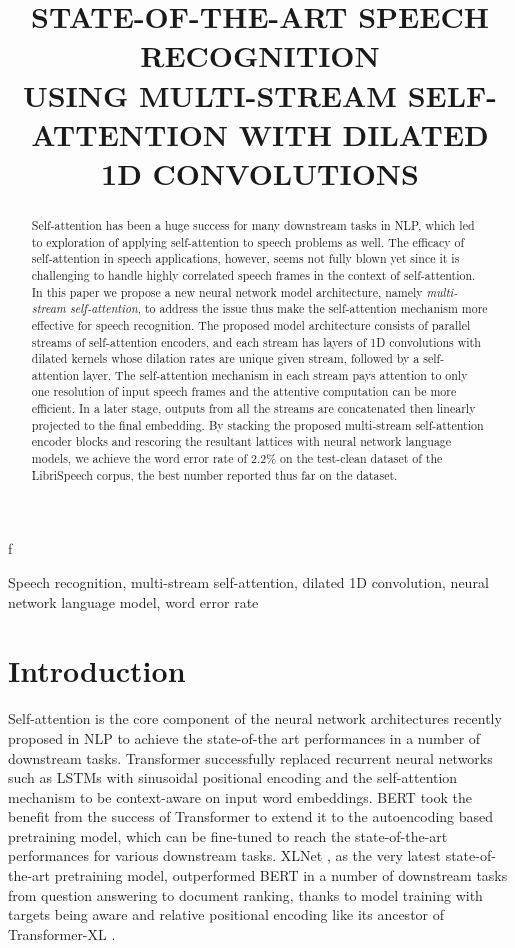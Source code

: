 f\documentclass{article}
\title{STATE-OF-THE-ART SPEECH RECOGNITION\\USING MULTI-STREAM SELF-ATTENTION WITH DILATED 1D CONVOLUTIONS}
\begin{document}
\maketitle
\begin{abstract}
Self-attention has been a huge success for many downstream tasks in NLP, which led to exploration of applying self-attention to speech problems as well. The efficacy of self-attention in speech applications, however, seems not fully blown yet since it is challenging to handle highly correlated speech frames in the context of self-attention. In this paper we propose a new neural network model architecture, namely \textit{multi-stream self-attention}, to address the issue thus make the self-attention mechanism more effective for speech recognition. The proposed model architecture consists of parallel streams of self-attention encoders, and each stream has layers of 1D convolutions with dilated kernels whose dilation rates are unique given stream, followed by a self-attention layer. The self-attention mechanism in each stream pays attention to only one resolution of input speech frames and the attentive computation can be more efficient. In a later stage, outputs from all the streams are concatenated then linearly projected to the final embedding. By stacking the proposed multi-stream self-attention encoder blocks and rescoring the resultant lattices with neural network language models, we achieve the word error rate of 2.2\% on the test-clean dataset of the LibriSpeech corpus, the best number reported thus far on the dataset.
\end{abstract}
\begin{keywords}
Speech recognition, multi-stream self-attention, dilated 1D convolution, neural network language model, word error rate
\end{keywords}
\section{Introduction}
\label{sec:intro}

Self-attention is the core component of the neural network architectures recently proposed in NLP \cite{vaswani,devlin,Yang2019XLNetGA} to achieve the state-of-the art performances in a number of downstream tasks. Transformer \cite{vaswani} successfully replaced recurrent neural networks such as LSTMs with sinusoidal positional encoding and the self-attention mechanism to be context-aware on input word embeddings. BERT \cite{devlin} took the benefit from the success of Transformer to extend it to the autoencoding based pretraining model, which can be fine-tuned to reach the state-of-the-art performances for various downstream tasks. XLNet \cite{Yang2019XLNetGA}, as the very latest state-of-the-art pretraining model, outperformed BERT in a number of downstream tasks from question answering to document ranking, thanks to model training with targets being aware and relative positional encoding like its ancestor of Transformer-XL \cite{Dai2019TransformerXLAL}.
\end{document}
